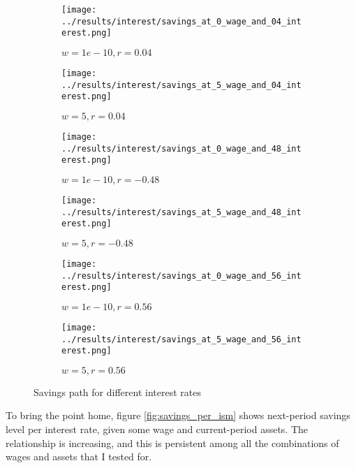 \documentclass[12pt]{article}
\begin{document}
\begin{figure}[hbt!]

\begin{subfigure}{0.5\textwidth}
\texttt{[image: ../results/interest/savings\_at\_0\_wage\_and\_04\_interest.png]} \caption{$w=1e-10, r=0.04$}
\end{subfigure}%
\begin{subfigure}{0.5\textwidth}
\texttt{[image: ../results/interest/savings\_at\_5\_wage\_and\_04\_interest.png]}
\caption{$w=5, r=0.04$}
\end{subfigure}

\begin{subfigure}{0.5\textwidth}
\texttt{[image: ../results/interest/savings\_at\_0\_wage\_and\_48\_interest.png]} \caption{$w=1e-10, r=-0.48$}
\end{subfigure}%
\begin{subfigure}{0.5\textwidth}
\texttt{[image: ../results/interest/savings\_at\_5\_wage\_and\_48\_interest.png]}
\caption{$w=5, r=-0.48$}
\end{subfigure}

\begin{subfigure}{0.5\textwidth}
\texttt{[image: ../results/interest/savings\_at\_0\_wage\_and\_56\_interest.png]} \caption{$w=1e-10, r=0.56$}
\end{subfigure}%
\begin{subfigure}{0.5\textwidth}
\texttt{[image: ../results/interest/savings\_at\_5\_wage\_and\_56\_interest.png]}
\caption{$w=5, r=0.56$}
\end{subfigure}

\caption{Savings path for different interest rates}
\label{fig:savings_by_interest}
\end{figure}


To bring the point home, figure \ref{fig:savings_per_ism} shows next-period savings level per interest rate, given some wage and current-period assets. The relationship is increasing, and this is persistent among all the combinations of wages and assets that I tested for.
\end{document}

